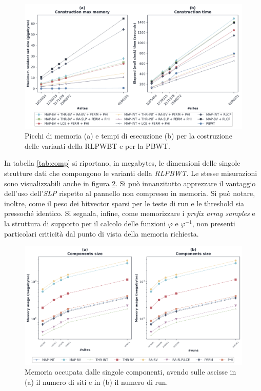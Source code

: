 \begin{figure}
  \centering
  \includegraphics[width=\linewidth]{img/make_time_mem_paper}
  \caption{Picchi di memoria (a) e tempi di esecuzione (b) per  la
    costruzione delle varianti della RLPWBT e per 
    la PBWT.}
  \label{fig:maketimememchr}
\end{figure}
In tabella \ref{tab:comp} si riportano, in megabytes, le dimensioni delle
singole strutture dati che compongono le varianti della \textit{RLPBWT}. Le
stesse misurazioni sono visualizzabili anche in figura \ref{fig:comp}. Si può
innanzitutto apprezzare il vantaggio dell'uso dell'\textit{SLP} rispetto al
pannello non compresso in memoria. Si può notare, inoltre, come il peso dei
bitvector sparsi per le teste di run e le threshold sia pressoché identico. Si
segnala, infine, come memorizzare i \textit{prefix array samples} e la struttura
di supporto per il calcolo delle funzioni $\varphi$ e $\varphi^{-1}$, non
presenti particolari criticità dal punto di vista della memoria richiesta.
\begin{figure}
  \centering
    \includegraphics[width=\linewidth]{img/comp_mem.png}
  \caption{Memoria occupata dalle singole componenti, avendo sulle ascisse in
    (a) il numero di siti e in (b) il numero di run. }
  \label{fig:comp}
\end{figure}
